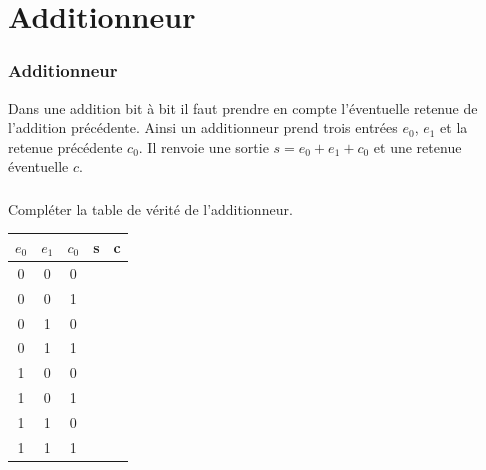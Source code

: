 \documentclass[svgnames,11pt]{beamer}
\begin{document}
\section{Additionneur}
\begin{frame}
    \frametitle{Additionneur}

    Dans une addition bit à bit il faut prendre en compte l'éventuelle retenue de l'addition précédente. Ainsi un additionneur prend trois entrées $e_0$, $e_1$ et la retenue précédente $c_0$. Il renvoie une sortie $s=e_0+e_1+c_0$ et une retenue éventuelle $c$.

\end{frame}
\begin{frame}
    \frametitle{}

    \begin{activite}
    Compléter la table de vérité de l'additionneur.
    \begin{center}
        \begin{tabular}{|c|c|c||c|c|}
            \hline
            $e_0$ & $e_1$ & $c_0$ & s&c \\
            \hline
            0 & 0 & 0 &  &                 \\
            \hline
            0 & 0 & 1 &      &            \\
            \hline
            0 & 1 & 0 &    &               \\
            \hline
            0 & 1 & 1 &   &              \\
            \hline
            1 & 0 & 0 &    &              \\
            \hline
            1 & 0 & 1 &   &               \\
            \hline
            1 & 1 & 0 &   &             \\
            \hline
            1 & 1 & 1 &  &               \\
            \hline
        \end{tabular}
    \end{center}
    \end{activite}
\end{frame}
\end{document}

